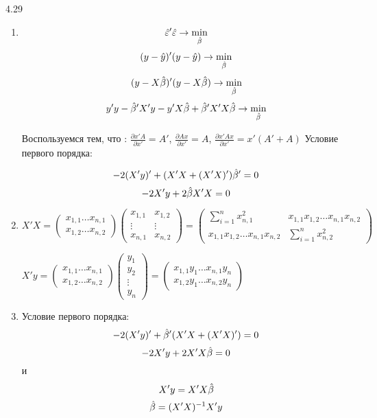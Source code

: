 \begin{solution}{{4.29}}
\begin{enumerate}
\item
\[\hat{\varepsilon}'\hat{\varepsilon}\rightarrow \min_{\hat{\beta}}\]
\[(y-\hat{y})'(y-\hat{y})\rightarrow\min_{\hat{\beta}}\]
\[(y-X\hat{\beta})'(y-X\hat{\beta})\rightarrow\min_{\hat{\beta}}\]
\[y'y-\hat{\beta}' X'y-y'X\hat{\beta}+\hat{\beta}'X'X\hat{\beta}\rightarrow\min_{\hat{\beta}}\]

Воспользуемся тем, что : $\frac{\partial x'A}{\partial x'}=A'$, $\frac{\partial Ax}{\partial x'}=A$,
$\frac{\partial x'Ax}{\partial x'}=x'(A'+A)$
Условие первого порядка:

\[-2(X'y)'+(X'X+(X'X)')\hat{\beta}'=0\]
\[-2X'y+2\hat{\beta} X'X=0\]

\item
$X'X=\begin{pmatrix}
x_{1,1}\ldots x_{n,1}\\
x_{1,2}\ldots x_{n,2}
\end{pmatrix}
\begin{pmatrix}
x_{1,1}& x_{1,2}\\
\vdots&\vdots\\
x_{n,1}& x_{n,2}
\end{pmatrix}=
\begin{pmatrix}
\sum_{i=1}^n x^2_{n,1}& x_{1,1}x_{1,2}\ldots x_{n,1}x_{n,2}\\
x_{1,1}x_{1,2}\ldots x_{n,1}x_{n,2}&\sum_{i=1}^nx^2_{n,2}
\end{pmatrix}$

$X'y=\begin{pmatrix}
x_{1,1}\ldots x_{n,1}\\
x_{1,2}\ldots x_{n,2}
\end{pmatrix}
\begin{pmatrix}
y_1\\
y_2\\
\vdots\\
y_n
\end{pmatrix}=
\begin{pmatrix}
x_{1,1}y_1\ldots x_{n,1}y_n\\
x_{1,2}y_1\ldots x_{n,2}y_n
\end{pmatrix}$

\item
Условие первого порядка:
\[-2(X'y)'+\hat{\beta}'(X'X+(X'X)')=0\]
\[-2X'y+2X'X \hat{\beta} =0\]
и
\[X'y=X'X\hat{\beta}\]
\[\hat{\beta}=(X'X)^{-1}X'y\]


\end{enumerate}
\end{solution}
